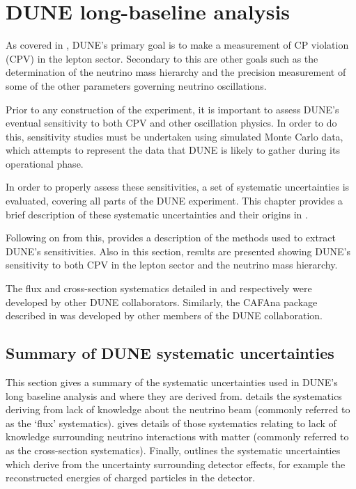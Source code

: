 \chapter{DUNE long-baseline analysis}
\label{sec:dune_lbl}

As covered in , DUNE's primary goal is to make a measurement of CP violation (CPV) in the lepton sector.
Secondary to this are other goals such as the determination of the neutrino mass hierarchy and the precision measurement of some of the other parameters governing neutrino oscillations.

Prior to any construction of the experiment, it is important to assess DUNE's eventual sensitivity to both CPV and other oscillation physics.
In order to do this, sensitivity studies must be undertaken using simulated Monte Carlo data, which attempts to represent the data that DUNE is likely to gather during its operational phase.

In order to properly assess these sensitivities, a set of systematic uncertainties is evaluated, covering all parts of the DUNE experiment.
This chapter provides a brief description of these systematic uncertainties and their origins in .

Following on from this,  provides a description of the methods used to extract DUNE's sensitivities.
Also in this section, results are presented showing DUNE's sensitivity to both CPV in the lepton sector and the neutrino mass hierarchy.

The flux and cross-section systematics detailed in  and  respectively were developed by other DUNE collaborators.
Similarly, the CAFAna package described in  was developed by other members of the DUNE collaboration.

\section{Summary of DUNE systematic uncertainties}
\label{sec:dune_lbl:systs}

This section gives a summary of the systematic uncertainties used in DUNE's long baseline analysis and where they are derived from.
 details the systematics deriving from lack of knowledge about the neutrino beam (commonly referred to as the `flux' systematics).
 gives details of those systematics relating to lack of knowledge surrounding neutrino interactions with matter (commonly referred to as the cross-section systematics).
Finally,  outlines the systematic uncertainties which derive from the uncertainty surrounding detector effects, for example the reconstructed energies of charged particles in the detector.

